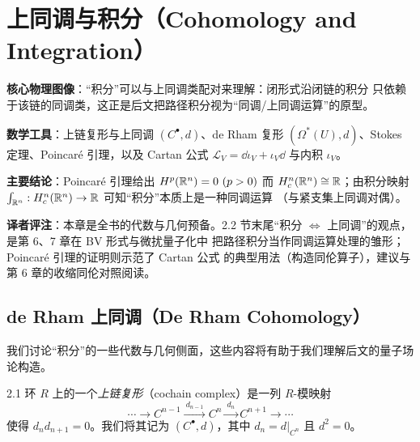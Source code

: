 
\section{上同调与积分（Cohomology and Integration）}

\begin{keypoints}
  \item \textbf{核心物理图像}：“积分”可以与上同调类配对来理解：闭形式沿闭链的积分
        只依赖于该链的同调类，这正是后文把路径积分视为“同调/上同调运算”的原型。
  \item \textbf{数学工具}：上链复形与上同调 $(C^{\bullet},d)$、de Rham 复形
        $(\Omega^{*}(U),d)$、Stokes 定理、Poincaré 引理，以及 Cartan 公式
        $\mathcal{L}_V=\dd\iota_V+\iota_V\dd$ 与内积 $\iota_V$。
  \item \textbf{主要结论}：Poincaré 引理给出 $H^{p}(\mathbb{R}^n)=0\ (p>0)$ 而
        $H^{n}_{c}(\mathbb{R}^n)\cong\mathbb{R}$；由积分映射
        $\int_{\mathbb{R}^n}:H^{n}_{c}(\mathbb{R}^n)\to\mathbb{R}$ 可知“积分”本质上是一种同调运算
        （与紧支集上同调对偶）。
  \item \textbf{译者评注}：本章是全书的代数与几何预备。2.2 节末尾“积分
        $\Longleftrightarrow$ 上同调”的观点，是第 6、7 章在 BV 形式与微扰量子化中
        把路径积分当作同调运算处理的雏形；Poincaré 引理的证明则示范了 Cartan 公式
        的典型用法（构造同伦算子），建议与第 6 章的收缩同伦对照阅读。
\end{keypoints}

\subsection{de Rham 上同调（De Rham Cohomology）}

我们讨论“积分”的一些代数与几何侧面，这些内容将有助于我们理解后文的量子场论构造。

\begin{wdefn}{2.1}
  环 $R$ 上的一个\emph{上链复形}（cochain complex）是一列 $R$-模映射
  \[
    \cdots\longrightarrow C^{n-1}\xrightarrow{\ d_{n-1}\ }C^{n}
    \xrightarrow{\ d_{n}\ }C^{n+1}\longrightarrow\cdots
  \]
  使得 $d_{n}d_{n+1}=0$。我们将其记为 $(C^{\bullet},d)$，其中
  $d_{n}=d|_{C^{n}}$ 且 $d^{2}=0$。
\end{wdefn}

